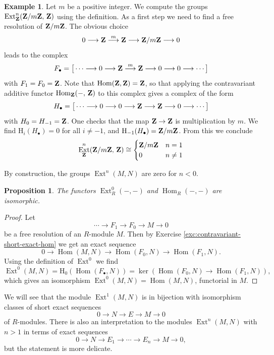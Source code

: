 \documentclass[11pt]{amsbook}
\newcommand{\longto}{\longrightarrow}
\DeclareMathOperator\Hom{Hom}
\DeclareMathOperator\Ext{Ext}
\def\rH{{\mathrm H}} \def\rK{{\mathrm K}} \def\rR{{\mathrm R}}
\theoremstyle{plain}
\newtheorem{proposition}[theorem]{Proposition}
\theoremstyle{definition}
\newtheorem{example}[theorem]{Example}
\begin{document}
\begin{example}
Let $m$ be a positive integer. We compute the groups $\Ext^n_{\bZ}(\bZ/m\bZ,\,\bZ)$ using the definition. As a first step we need to find a free resolution of ${\mathbf{Z}}/m{\mathbf{Z}}$. The obvious choice
\[
	0 \longto \bZ \overset{m}{\longto} \bZ \longto \bZ/m\bZ \longto 0
\] 
leads to the complex
\[
	F_\bullet = \big[ \cdots \longto 0 \longto \bZ \overset{m}{\longto} \bZ \longto 0 \longto 0 \longto \cdots \big]
\]
with $F_1=F_0={\mathbf{Z}}$. Note that $\Hom(\bZ,\bZ)= \bZ$, so that applying the contravariant additive functor $\Hom_\bZ(-,\,\bZ)$ to this complex gives a complex of the form
\[
	H_\bullet = \big[ \cdots \longto 0 \longto 0 \longto \bZ \longto \bZ \longto 0 \longto \cdots \big]
\]
with $H_0=H_{-1} = {\mathbf{Z}}$. One checks that the map ${\mathbf{Z}}\to{\mathbf{Z}}$ is multiplication by $m$. We find $\rH_i(H_\bullet)=0$ for all $i\neq -1$, and $\rH_{-1}(H_\bullet) = \bZ/m\bZ$. From this we conclude
\[
	\Ext^n_{\bZ}(\bZ/m\bZ,\,\bZ) \cong \begin{cases} \bZ/m\bZ & n = 1 \\ 0 & n \neq 1 \end{cases}
\]

\end{example}


By construction, the groups $\Ext^n(M,N)$ are zero for $n<0$. 

\begin{proposition}
The functors $\Ext^0_R(-,-)$ and $\Hom_R(-,-)$ are isomorphic.
\end{proposition}

\begin{proof}
Let
\[
	\cdots \longto F_1 \longto F_0 \longto M \longto 0
\]
be a free resolution of an $R$-module $M$. Then by Exercise \ref{exc:contravariant-short-exact-hom} we get
an exact sequence
\[
	0 \longto \Hom(M,N) \longto \Hom(F_0,N) \longto \Hom(F_1,N). 
\]
Using the definition of $\Ext^0$ we find
\[
	\Ext^0(M,N) = \rH_0( \Hom(F_\bullet,N))  = 
	\ker( \Hom(F_0,N) \longto \Hom(F_1,N) ),
\]
which gives an isomorphism $\Ext^0(M,N)=\Hom(M,N)$, functorial in $M$.
\end{proof}


We will see that the module $\Ext^1(M,N)$ is in bijection with isomorphism classes
of short exact sequences
\[
	0 \longto N \longto E \longto M \longto 0
\]
of $R$-modules. There is also an interpretation to the modules $\Ext^n(M,N)$ with $n>1$ in terms of exact sequences
\[
	 0 \longto N \longto E_1 \longto \cdots \longto E_n \longto M \longto 0,
\]
but the statement is more delicate. 
\end{document}
